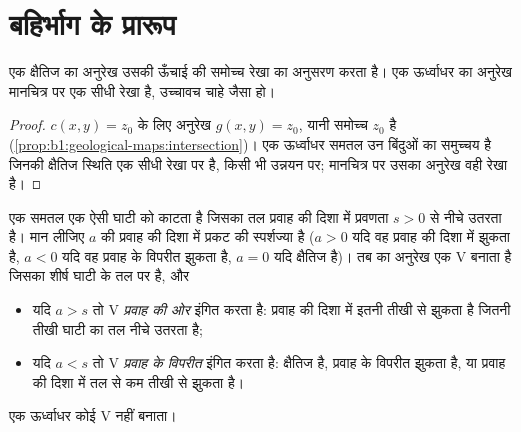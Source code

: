 \section{बहिर्भाग के प्रारूप}

\begin{proposition}[क्षैतिज और ऊर्ध्वाधर संपर्क]\label{prop:b1:geological-maps:hv}
एक क्षैतिज  का अनुरेख उसकी ऊँचाई की समोच्च रेखा का अनुसरण करता है। एक ऊर्ध्वाधर  का अनुरेख मानचित्र पर
एक सीधी रेखा है, उच्चावच चाहे जैसा हो।
\end{proposition}

\begin{proof}
$c(x,y) = z_0$ के लिए अनुरेख $g(x,y) = z_0$, यानी समोच्च $z_0$ है
(\cref{prop:b1:geological-maps:intersection})। एक ऊर्ध्वाधर समतल उन बिंदुओं का समुच्चय है जिनकी क्षैतिज स्थिति
एक सीधी रेखा पर है, किसी भी उन्नयन पर; मानचित्र पर उसका अनुरेख वही रेखा है।
\end{proof}

\begin{theorem}[V-नियम]\label{thm:b1:geological-maps:v-rule}
एक समतल  एक ऐसी घाटी को काटता है जिसका तल प्रवाह की दिशा में प्रवणता $s > 0$ से नीचे उतरता है। मान लीजिए
$a$  की प्रवाह की दिशा में प्रकट  की स्पर्शज्या है ($a > 0$ यदि वह प्रवाह की दिशा में झुकता है, $a < 0$ यदि
वह प्रवाह के विपरीत झुकता है, $a = 0$ यदि क्षैतिज है)। तब  का अनुरेख एक V बनाता है जिसका शीर्ष घाटी
के तल पर है, और
\begin{itemize}
  \item यदि $a > s$ तो V \emph{प्रवाह की ओर} इंगित करता है:  प्रवाह की दिशा में इतनी तीखी  से झुकता है
        जितनी तीखी घाटी का तल नीचे उतरता है;
  \item यदि $a < s$ तो V \emph{प्रवाह के विपरीत} इंगित करता है:  क्षैतिज है, प्रवाह के विपरीत झुकता है, या
        प्रवाह की दिशा में तल से कम तीखी  से झुकता है।
\end{itemize}
एक ऊर्ध्वाधर  कोई V नहीं बनाता।
\end{theorem}

